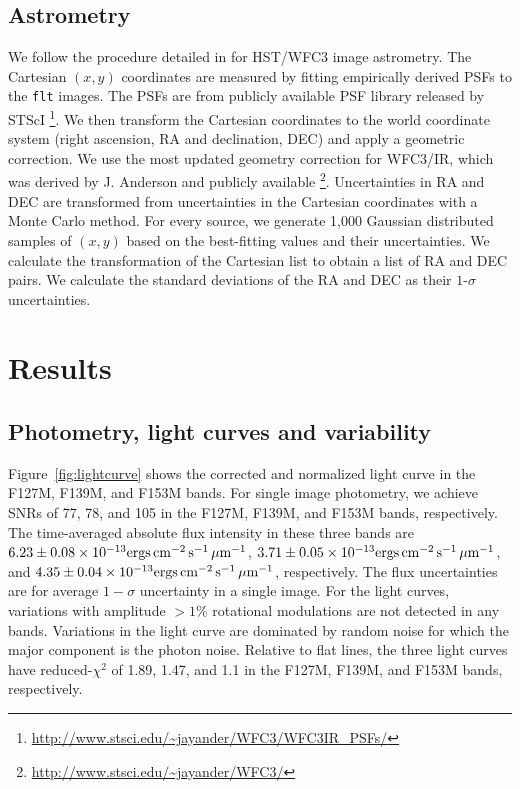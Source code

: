 \documentclass[twocolumn]{aastex62}
\begin{document}
\subsection{Astrometry}
We follow the procedure detailed in \citet{Bedin2018} for HST/WFC3 image astrometry. The Cartesian $(x, y)$ coordinates are measured by fitting empirically derived PSFs to the \texttt{flt} images. The PSFs are from publicly available PSF library released by STScI \footnote{\url{http://www.stsci.edu/~jayander/WFC3/WFC3IR\_PSFs/}}. We then transform the Cartesian coordinates to the world coordinate system (right ascension, RA and declination, DEC) and apply a geometric correction. We use the most updated geometry correction for WFC3/IR, which was derived by J. Anderson and publicly available \footnote{\url{http://www.stsci.edu/~jayander/WFC3/}}.  Uncertainties in RA and DEC are transformed from uncertainties in the Cartesian coordinates with a Monte Carlo method. For every source, we generate 1,000 Gaussian distributed samples of $(x, y)$  based on the best-fitting values and their uncertainties. We calculate the transformation of the Cartesian list  to obtain a list of RA and DEC pairs. We calculate the standard deviations of the RA and DEC as their $1$-$\sigma$ uncertainties.

\section{Results}
\subsection{Photometry, light curves and variability}

\newcommand{\fluxunit}{\ensuremath{\mathrm{ergs}\,\mathrm{cm^{-2}}\,\mathrm{s^{-1}}\,\mathrm{\micron^{{-1}}}}}
Figure~\ref{fig:lightcurve} shows the corrected and normalized light curve in the F127M, F139M, and F153M bands. For single image photometry, we achieve  SNRs of  77, 78, and 105 in the F127M, F139M, and F153M bands, respectively. The time-averaged absolute flux intensity in these three bands are $6.23\pm0.08\times10^{-13}\fluxunit$, $3.71\pm0.05\times10^{-13}\fluxunit$, and $4.35\pm0.04\times10^{{-13}}\fluxunit$, respectively. The flux uncertainties are for average $1-\sigma$ uncertainty in a single image.  For the light curves, variations with amplitude $>1\%$ rotational modulations are not detected in any bands. Variations in the light curve are dominated by random noise for which the major component is the photon noise. Relative to flat lines, the three light curves have reduced-$\chi^{2}$ of 1.89, 1.47, and 1.1 in the F127M, F139M, and F153M bands, respectively.
\end{document}
